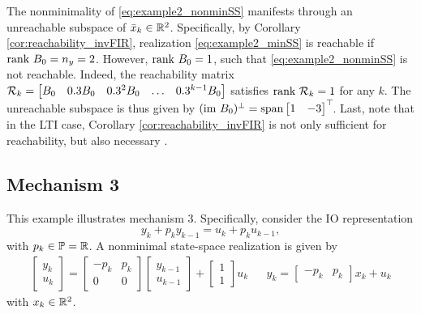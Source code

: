 The nonminimality of \eqref{eq:example2_nonminSS} manifests through an unreachable subspace of $\bar{x}_k \in \mathbb{R}^2$. Specifically, by Corollary \ref{cor:reachability_invFIR}, realization \eqref{eq:example2_minSS} is reachable if $\textrm{rank}\ B_0 = n_y = 2$. However, $\textrm{rank}\ B_0 = 1$, such that \eqref{eq:example2_nonminSS} is not reachable. Indeed, the reachability matrix $\mathcal{R}_k = \begin{bmatrix} B_0 & 0.3 B_0 & 0.3^2 B_0 & \hdots & 0.3^{k-1} B_0 \end{bmatrix}$ satisfies $\textrm{rank}\ \mathcal{R}_k = 1$ for any $k$. The unreachable subspace is thus given by $(\textrm{im}\ B_0)^\perp = \textrm{span} \begin{bmatrix} 1 & -3 \end{bmatrix}^\top\!$. Last, note that in the LTI case, Corollary \ref{cor:reachability_invFIR} is not only sufficient for reachability, but also necessary \cite{hespanha2018linear}.

\subsection{Mechanism 3}
This example illustrates mechanism 3. Specifically, consider the IO representation
\begin{equation}\label{eq:example3_IO}
    y_k + p_{k} y_{k-1} = u_k + p_k u_{k-1},
\end{equation}
with $p_k\in\mathbb{P} = \mathbb{R}$. A nonminimal state-space realization is given by
\begin{align}\label{eq:example3_nonminSS}
    \left[\begin{array}{c}
        y_k \\ \hline u_k
    \end{array}\right]
    =
    \left[\begin{array}{c|c}
        -p_{k} & p_k \\ \hline 0 & 0
    \end{array}\right]
    \left[\begin{array}{c}
        y_{k-1} \\ \hline u_{k-1}
    \end{array}\right]
    + \left[\begin{array}{c}
        1 \\ \hline 1
    \end{array}\right] u_k 
    & & y_k = \left[\begin{array}{c|c} -p_{k} & p_k \end{array}\right] x_k + u_k
\end{align}
with $x_k\in\mathbb{R}^2$.


